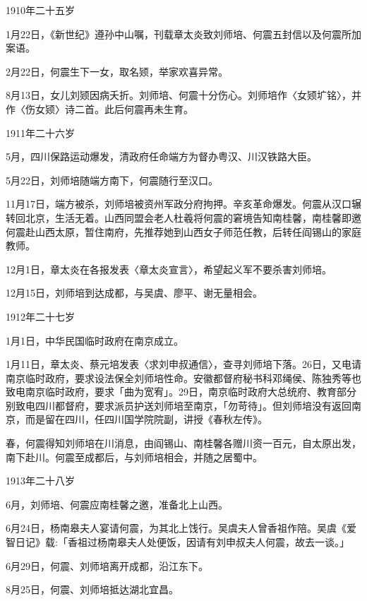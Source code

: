 1910年二十五岁

1月22日，《新世纪》遵孙中山嘱，刊载章太炎致刘师培、何震五封信以及何震所加案语。

2月22日，何震生下一女，取名颎，举家欢喜异常。

8月13日，女儿刘颎因病夭折。刘师培、何震十分伤心。刘师培作〈女颎圹铭〉，并作〈伤女颎〉诗二首。此后何震再未生育。

1911年二十六岁

5月，四川保路运动爆发，清政府任命端方为督办粤汉、川汉铁路大臣。

5月22日，刘师培随端方南下，何震随行至汉口。

11月17日，端方被杀，刘师培被资州军政分府拘押。辛亥革命爆发。何震从汉口辗转回北京，生活无着。山西同盟会老人杜羲将何震的窘境告知南桂馨，南桂馨即邀何震赴山西太原，暂住南府，先推荐她到山西女子师范任教，后转任阎锡山的家庭教师。

\vfill
\begin{BookNotes}
\end{BookNotes}

12月1日，章太炎在各报发表〈章太炎宣言〉，希望起义军不要杀害刘师培。

12月15日，刘师培到达成都，与吴虞、廖平、谢无量相会。

1912年二十七岁

1月1日，中华民国临时政府在南京成立。

1月11日，章太炎、蔡元培发表〈求刘申叔通信〉，查寻刘师培下落。26日，又电请南京临时政府，要求设法保全刘师培性命。安徽都督府秘书科邓绳侯、陈独秀等也致电南京临时政府，要求「曲为宽宥」。29日，南京临时政府大总统府、教育部分别致电四川都督府，要求派员护送刘师培至南京，「勿苛待」。但刘师培没有返回南京，而是留在四川，任四川国学院院副，讲授《春秋左传》。

春，何震得知刘师培在川消息，由阎锡山、南桂馨各赠川资一百元，自太原出发，南下赴川。何震至成都后，与刘师培相会，并随之居蜀中。

1913年二十八岁

6月，刘师培、何震应南桂馨之邀，准备北上山西。

6月24日，杨南皋夫人宴请何震，为其北上饯行。吴虞夫人曾香祖作陪。吴虞《爱智日记》载:「香祖过杨南皋夫人处便饭，因请有刘申叔夫人何震，故去一谈。」

6月29日，何震、刘师培离开成都，沿江东下。

8月25日，何震、刘师培抵达湖北宜昌。

